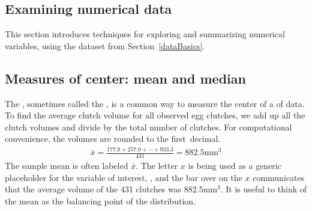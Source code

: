 \begin{doublespace}

\section[Examining numerical data]{Examining numerical data}
\label{numericalData}

This section introduces techniques for exploring and summarizing numerical variables, using the  dataset from Section~\ref{dataBasics}.

\subsection{Measures of center: mean and median}
\label{measuresOfCenter}

The , sometimes called the , is a common way to measure the center of a  of data. To find the average clutch volume for all observed egg clutches, we add up all the clutch volumes and divide by the total number of clutches. For computational convenience, the volumes are rounded to the first~decimal.
\begin{eqnarray}
\bar{x} = \frac{177.8 + 257.0 + \cdots + 933.3}{431} = 882.5 \textrm{mm}^{3}
\label{sampleMeanEquation}
\end{eqnarray}
The sample mean is often labeled $\overline{x}$. The letter $x$ is being used as a generic placeholder for the variable of interest, , and the bar over on the $x$ communicates that the average volume of the 431 clutches was $882.5\textrm{mm}^{3}$. It is useful to think of the mean as the balancing point of the distribution. 


\end{doublespace}
